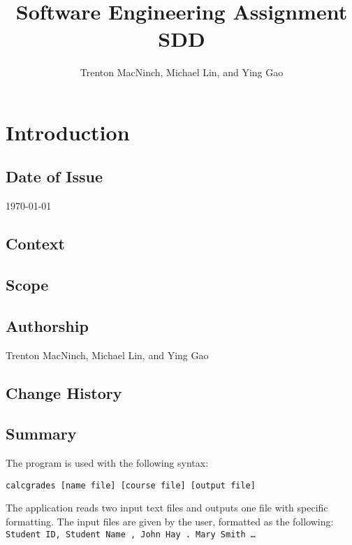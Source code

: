 \documentclass{article}
\title{\textbf{Software Engineering Assignment SDD}}
\author{Trenton MacNinch, Michael Lin, and Ying Gao}
\begin{document}
\maketitle
\newpage

\tableofcontents
\newpage

\section{Introduction}
\subsection{Date of Issue}
\today
\subsection{Context}
\subsection{Scope}
\subsection{Authorship}
Trenton MacNinch, Michael Lin, and Ying Gao
\subsection{Change History}
\subsection{Summary}
The program is used with the following syntax:

\texttt{calcgrades [name file] [course file] [output file]}

The application reads two input text files and outputs one file with specific formatting.
The input files are given by the user, formatted as the following:
\texttt{  \newline
  Student ID, Student Name , John Hay . Mary Smith \newline
  \ldots
}
\end{document}
